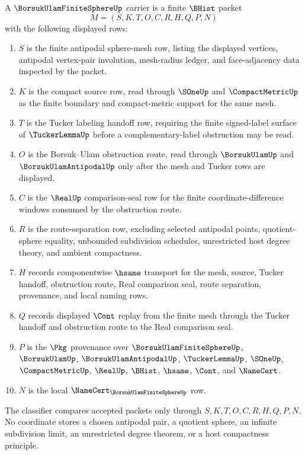 \begin{definition}
\label{def:borsuk-ulam-finite-sphere-carrier}
A $\BorsukUlamFiniteSphereUp$ carrier is a finite $\BHist$ packet
$$
M=(S,K,T,O,C,R,H,Q,P,N)
$$
with the following displayed rows:
\begin{enumerate}
\item $S$ is the finite antipodal sphere-mesh row, listing the displayed vertices, antipodal vertex-pair involution, mesh-radius ledger, and face-adjacency data inspected by the packet.
\item $K$ is the compact source row, read through $\SOneUp$ and $\CompactMetricUp$ as the finite boundary and compact-metric support for the same mesh.
\item $T$ is the Tucker labeling handoff row, requiring the finite signed-label surface of $\TuckerLemmaUp$ before a complementary-label obstruction may be read.
\item $O$ is the Borsuk--Ulam obstruction route, read through $\BorsukUlamUp$ and $\BorsukUlamAntipodalUp$ only after the mesh and Tucker rows are displayed.
\item $C$ is the $\RealUp$ comparison-seal row for the finite coordinate-difference windows consumed by the obstruction route.
\item $R$ is the route-separation row, excluding selected antipodal points, quotient-sphere equality, unbounded subdivision schedules, unrestricted host degree theory, and ambient compactness.
\item $H$ records componentwise $\hsame$ transport for the mesh, source, Tucker handoff, obstruction route, Real comparison seal, route separation, provenance, and local naming rows.
\item $Q$ records displayed $\Cont$ replay from the finite mesh through the Tucker handoff and obstruction route to the Real comparison seal.
\item $P$ is the $\Pkg$ provenance over $\BorsukUlamFiniteSphereUp$, $\BorsukUlamUp$, $\BorsukUlamAntipodalUp$, $\TuckerLemmaUp$, $\SOneUp$, $\CompactMetricUp$, $\RealUp$, $\BHist$, $\hsame$, $\Cont$, and $\NameCert$.
\item $N$ is the local $\NameCert_{\BorsukUlamFiniteSphereUp}$ row.
\end{enumerate}
The classifier compares accepted packets only through $S,K,T,O,C,R,H,Q,P,N$. No coordinate stores a chosen antipodal pair, a quotient sphere, an infinite subdivision limit, an unrestricted degree theorem, or a host compactness principle.
\end{definition}

